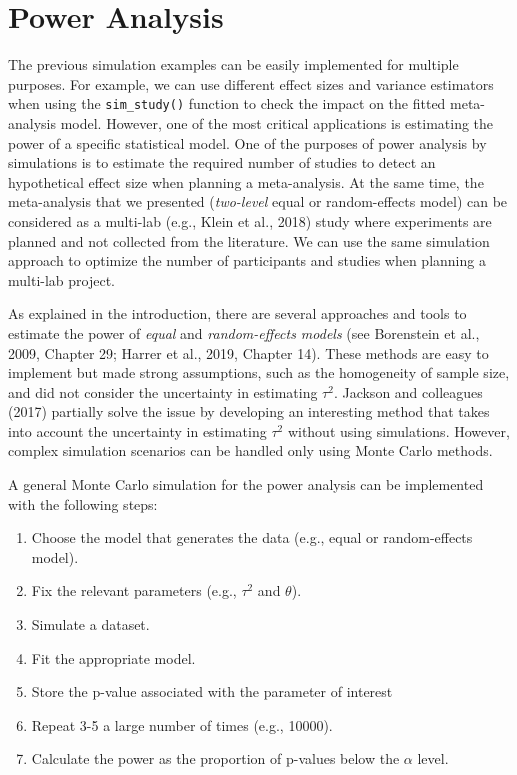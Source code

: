 \documentclass[
  man,floatsintext]{apa6}
\providecommand{\tightlist}{%
  \setlength{\itemsep}{0pt}\setlength{\parskip}{0pt}}
\begin{document}
\normalsize

\hypertarget{power-analysis}{%
\section{Power Analysis}\label{power-analysis}}

The previous simulation examples can be easily implemented for multiple purposes. For example, we can use different effect sizes and variance estimators when using the \texttt{sim\_study()} function to check the impact on the fitted meta-analysis model. However, one of the most critical applications is estimating the power of a specific statistical model. One of the purposes of power analysis by simulations is to estimate the required number of studies to detect an hypothetical effect size when planning a meta-analysis. At the same time, the meta-analysis that we presented (\emph{two-level} equal or random-effects model) can be considered as a multi-lab (e.g., Klein et al., 2018) study where experiments are planned and not collected from the literature. We can use the same simulation approach to optimize the number of participants and studies when planning a multi-lab project.

As explained in the introduction, there are several approaches and tools to estimate the power of \emph{equal} and \emph{random-effects models} (see Borenstein et al., 2009, Chapter 29; Harrer et al., 2019, Chapter 14). These methods are easy to implement but made strong assumptions, such as the homogeneity of sample size, and did not consider the uncertainty in estimating \(\tau^{2}\). Jackson and colleagues (2017) partially solve the issue by developing an interesting method that takes into account the uncertainty in estimating \(\tau^{2}\) without using simulations. However, complex simulation scenarios can be handled only using Monte Carlo methods.

A general Monte Carlo simulation for the power analysis can be implemented with the following steps:

\begin{enumerate}
\def\labelenumi{\arabic{enumi}.}
\tightlist
\item
  Choose the model that generates the data (e.g., equal or random-effects model).
\item
  Fix the relevant parameters (e.g., \(\tau^{2}\) and \(\theta\)).
\item
  Simulate a dataset.
\item
  Fit the appropriate model.
\item
  Store the p-value associated with the parameter of interest
\item
  Repeat 3-5 a large number of times (e.g., 10000).
\item
  Calculate the power as the proportion of p-values below the \(\alpha\) level.
\end{enumerate}
\end{document}
